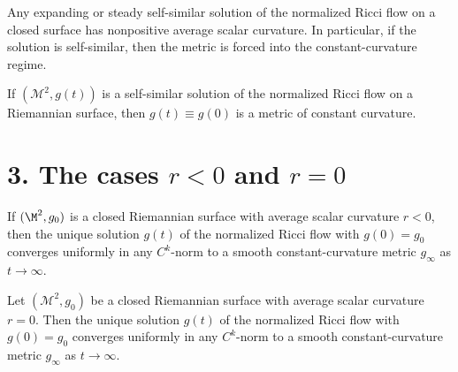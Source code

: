 \begin{proposition}
\label{ch05-prop-self-similar-solutions-constant-curvature}
Any expanding or steady self-similar solution of the normalized Ricci flow on a closed surface has nonpositive average scalar curvature. In particular, if the solution is self-similar, then the metric is forced into the constant-curvature regime.
\end{proposition}

\begin{proposition}
\label{ch05-prop-self-similar-constant-curvature}
If \((\mathcal{M}^2,g(t))\) is a self-similar solution of the normalized Ricci flow on a Riemannian surface, then \(g(t)\equiv g(0)\) is a metric of constant curvature.
\end{proposition}

\section*{3. The cases \(r<0\) and \(r=0\)}

\begin{theorem}
\label{ch05-thm-negative-average-curvature}
If \((\M^2,g_0)\) is a closed Riemannian surface with average scalar curvature \(r<0\), then the unique solution \(g(t)\) of the normalized Ricci flow with \(g(0)=g_0\) converges uniformly in any \(C^k\)-norm to a smooth constant-curvature metric \(g_\infty\) as \(t\to\infty\).
\end{theorem}

\begin{theorem}
\label{ch05-thm-zero-average-curvature}
Let \((\mathcal{M}^2,g_0)\) be a closed Riemannian surface with average scalar curvature \(r=0\). Then the unique solution \(g(t)\) of the normalized Ricci flow with \(g(0)=g_0\) converges uniformly in any \(C^k\)-norm to a smooth constant-curvature metric \(g_\infty\) as \(t\to\infty\).
\end{theorem}

